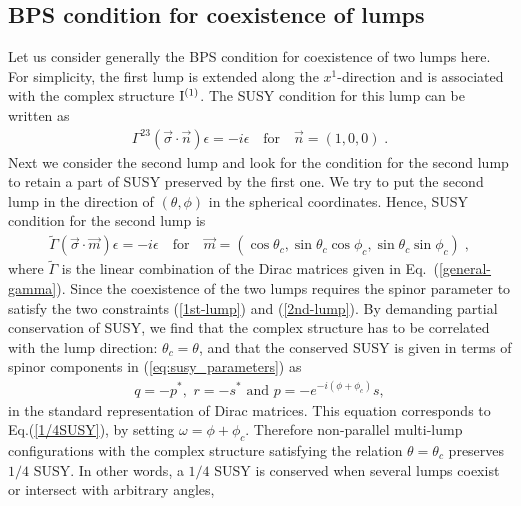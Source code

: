 \documentclass[a4paper,12pt]{article}
\begin{document}
\subsection{BPS condition for coexistence of lumps}
Let us consider generally the BPS condition for coexistence of two lumps here. 
For simplicity, the first lump is extended along the $x^1$-direction 
and is associated with the complex structure ${\rm I}^{(1)}$. 
The SUSY condition for this lump can be written as  
\begin{eqnarray}
\Gamma^{23}(\vec{\sigma}\cdot \vec{n}) \epsilon 
 = -i\epsilon \quad 
\mbox{for} \quad \vec{n}=(1,0,0) \;. 
\label{1st-lump}
\end{eqnarray}
Next we consider the second lump and look for the condition for the 
second lump to retain a part of SUSY preserved by the first one. 
We try to put the second lump in the direction of $(\theta, \phi)$ 
in the spherical coordinates.
Hence, SUSY condition for the second lump is 
\begin{eqnarray}
\tilde{\Gamma}(\vec{\sigma}\cdot \vec{m}) \epsilon = -i\epsilon 
\quad \mbox{for} \quad \vec{m}
=(\cos\theta_c, \sin\theta_c\cos\phi_c, \sin\theta_c\sin\phi_c)\;, 
\label{2nd-lump}
\end{eqnarray}
where 
$\tilde{\Gamma}$ is the linear combination of the Dirac matrices 
given in Eq.~(\ref{general-gamma}). 
Since the coexistence of the two lumps requires 
 the spinor parameter to satisfy 
the two constraints (\ref{1st-lump}) and (\ref{2nd-lump}). 
By demanding partial conservation of SUSY, we find that 
the complex structure has to be correlated with the lump direction:
$\theta_c = \theta $, 
and that the conserved SUSY is given in terms of spinor components 
in (\ref{eq:susy_parameters}) as 
\begin{eqnarray}
  q=-p^*, \,\, r=-s^* \,\, \mbox{and} \,\, p=-e^{-i(\phi+\phi_c)}s,  
\end{eqnarray}
in the standard representation of Dirac matrices.
This equation corresponds to Eq.(\ref{1/4SUSY}), by setting 
$\omega=\phi+\phi_c$. 
Therefore non-parallel multi-lump configurations with the 
complex structure satisfying the relation $\theta = \theta_c$ 
preserves $1/4$ SUSY. 
In other words, a $1/4$ SUSY is conserved 
when several lumps coexist or intersect with arbitrary angles, 
\end{document}
